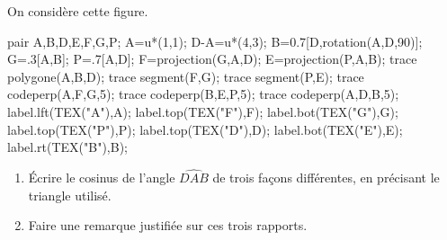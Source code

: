\begin{exercice*}
    On considère cette figure.

    \begin{center}
        \begin{Geometrie}
            pair A,B,D,E,F,G,P;
            A=u*(1,1);
            D-A=u*(4,3);
            B=0.7[D,rotation(A,D,90)];            
            G=.3[A,B];
            P=.7[A,D];
            F=projection(G,A,D);
            E=projection(P,A,B);
            trace polygone(A,B,D);
            trace segment(F,G);
            trace segment(P,E);
            trace codeperp(A,F,G,5);
            trace codeperp(B,E,P,5);
            trace codeperp(A,D,B,5);
            label.lft(TEX("A"),A);
            label.top(TEX("F"),F);
            label.bot(TEX("G"),G);
            label.top(TEX("P"),P);
            label.top(TEX("D"),D);
            label.bot(TEX("E"),E);
            label.rt(TEX("B"),B);
        \end{Geometrie}
    \end{center}
    \begin{enumerate}
        \item Écrire le cosinus de l'angle $\widehat{DAB}$ de trois façons différentes, en précisant le triangle utilisé.
        \item Faire une remarque justifiée sur ces trois rapports.
    \end{enumerate}
\end{exercice*}
